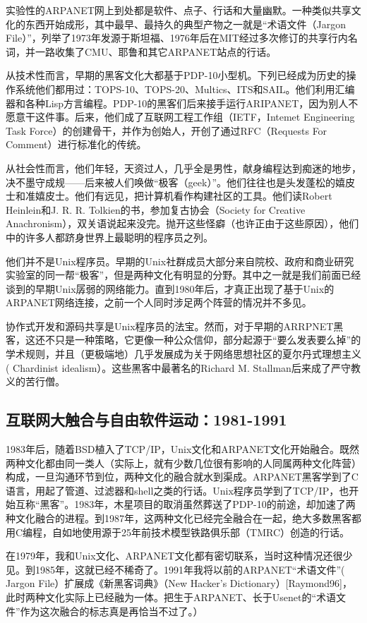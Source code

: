\documentclass[12pt,oneside]{book}
\begin{document}
\begin{common-format}
实验性的ARPANET网上到处都是软件、点子、行话和大量幽默。一种类似共享文化的东西开始成形，其中最早、最持久的典型产物之一就是“术语文件（Jargon File）”，列举了1973年发源于斯坦福、1976年后在MIT经过多次修订的共享行内名词，并一路收集了CMU、耶鲁和其它ARPANET站点的行话。

从技术性而言，早期的黑客文化大都基于PDP-10小型机。下列已经成为历史的操作系统他们都用过：TOPS-10、TOPS-20、Multics、ITS和SAIL。他们利用汇编器和各种Lisp方言编程。PDP-10的黑客们后来接手运行ARIPANET，因为别人不愿意干这件事。后来，他们成了互联网工程工作组（IETF，Intemet Engineering Task Force）的创建骨干，并作为创始人，开创了通过RFC（Requests For Comment）进行标准化的传统。

从社会性而言，他们年轻，天资过人，几乎全是男性，献身编程达到痴迷的地步，决不墨守成规——后来被人们唤做“极客（geek）”。他们往往也是头发蓬松的嬉皮士和准嬉皮士。他们有远见，把计算机看作构建社区的工具。他们读Robert Heinlein和J. R. R. Tolkien的书，参加复古协会（Society for Creative Anachronism），双关语说起来没完。抛开这些怪癖（也许正由于这些原因），他们中的许多人都跻身世界上最聪明的程序员之列。

他们并不是Unix程序员。早期的Unix社群成员大部分来自院校、政府和商业研究实验室的同一帮“极客”，但是两种文化有明显的分野。其中之一就是我们前面已经谈到的早期Unix孱弱的网络能力。直到1980年后，才真正出现了基于Unix的ARPANET网络连接，之前一个人同时涉足两个阵营的情况并不多见。

协作式开发和源码共享是Unix程序员的法宝。然而，对于早期的ARRPNET黑客，这还不只是一种策略，它更像一种公众信仰，部分起源于“要么发表要么掉”的学术规则，并且（更极端地）几乎发展成为关于网络思想社区的夏尔丹式理想主义( Chardinist idealism）。这些黑客中最著名的Richard M. Stallman后来成了严守教义的苦行僧。

\subsection{互联网大触合与自由软件运动：1981-1991}
1983年后，随着BSD植入了TCP/IP，Unix文化和ARPANET文化开始融合。既然两种文化都由同一类人（实际上，就有少数几位很有影响的人同属两种文化阵营）构成，一旦沟通环节到位，两种文化的融合就水到渠成。ARPANET黑客学到了C语言，用起了管道、过滤器和shell之类的行话。Unix程序员学到了TCP/IP，也开始互称“黑客”。1983年，木星项目的取消虽然葬送了PDP-10的前途，却加速了两种文化融合的进程。到1987年，这两种文化已经完全融合在一起，绝大多数黑客都用C编程，自如地使用源于25年前技术模型铁路俱乐部（TMRC）创造的行话。

在1979年，我和Unix文化、ARPANET文化都有密切联系，当时这种情况还很少见。到1985年，这就已经不稀奇了。1991年我将以前的ARPANET“术语文件”( Jargon File）扩展成《新黑客词典》（New Hacker's Dictionary）[Raymond96]，此时两种文化实际上已经融为一体。把生于ARPANET、长于Usenet的“术语文件”作为这次融合的标志真是再恰当不过了。）


\end{common-format}
\end{document}
